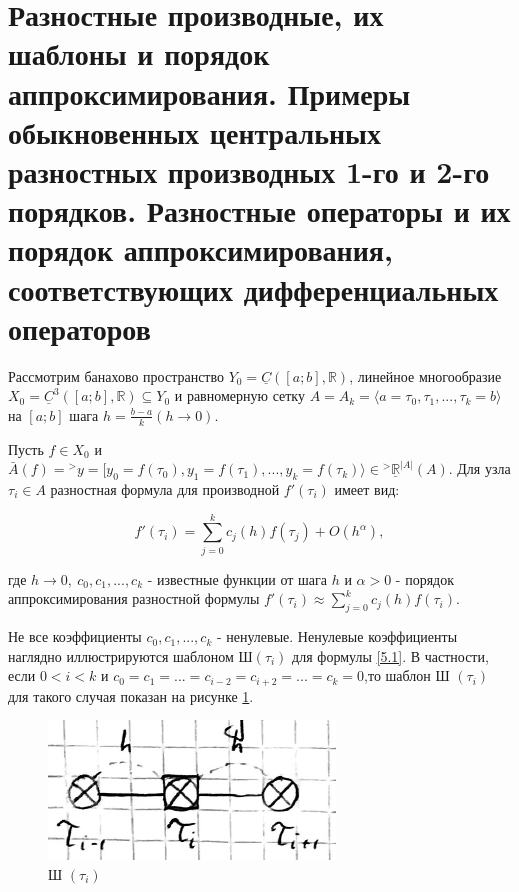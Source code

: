 \documentclass[__main__.tex]{subfiles}
\begin{document}
\section{Разностные производные, их шаблоны и порядок аппроксимирования. Примеры обыкновенных центральных разностных производных 1-го и 2-го порядков. Разностные операторы и их порядок аппроксимирования, соответствующих дифференциальных операторов}

Рассмотрим банахово пространство $Y_0 = \underline{C} \left( \left[ a; b \right], \mathbb{R} \right)$, линейное многообразие $X_0 = \underline{C}^3 \left( \left[ a; b \right], \mathbb{R} \right) \subseteq Y_0$ и равномерную сетку $A = A_k = \langle a = \tau_0, \tau_1, ..., \tau_k = b \rangle$ на $\left[ a; b\right]$ шага $h = \frac{b-a}{k} \left( h \rightarrow 0 \right)$.

Пусть $f \in X_0$ и $\bar{A} \left( f \right) = {}^> y =  [ y_0 = f \left( \tau_0 \right), y_1 = f \left( \tau_1 \right), ..., y_k = f \left( \tau_k \right) \rangle \in {}^> \underline{\mathbb{R}}^{\left| A \right|} \left( A \right)$. Для узла $\tau_i \in A$ разностная формула для производной $f' \left( \tau_i \right)$ имеет вид:

\begin{equation} \label{5.1}
f' \left( \tau_i \right) = \sum_{j=0}^{k} c_j \left( h \right) f\left( \tau_j \right) + O \left( h^\alpha \right),
\end{equation}

где $h \rightarrow 0, \ c_0, c_1, ..., c_k$ - известные функции от шага $h$ и $\alpha > 0$ - порядок аппроксимирования разностной формулы $f' \left( \tau_i \right) \approx \sum_{j=0}^{k} c_j \left( h \right) f \left( \tau_i \right)$.

Не все коэффициенты $c_0, c_1, ..., c_k$ - ненулевые. Ненулевые коэффициенты наглядно иллюстрируются шаблоном Ш$\left(\tau_i\right)$ для формулы \ref{5.1}. В частности, если $0<i<k$ и $c_0 = c_1 = ... = c_{i-2} = c_{i+2} = ... = c_k = 0$,то шаблон Ш $\left( \tau_i \right)$ для такого случая показан на рисунке \ref{img_5.1}.

\begin{figure}[h!]
	\centering
	\includegraphics[width=0.3\linewidth]{img/img_5-1}
	\caption{Ш $\left( \tau_i \right)$}
	\label{img_5.1}
\end{figure}
\end{document}
